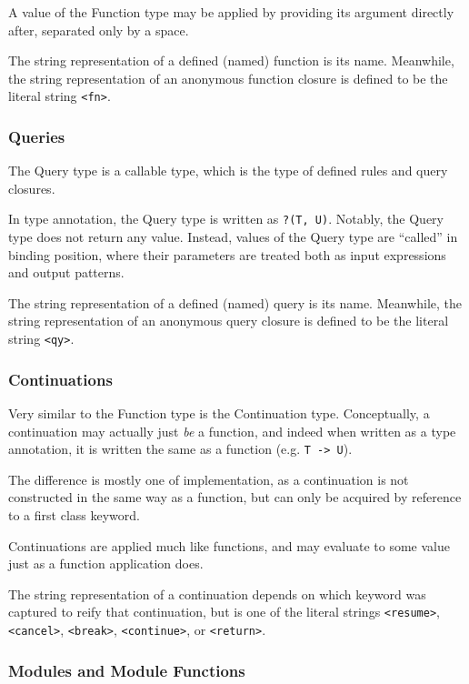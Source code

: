 A value of the Function type may be applied by providing its argument directly after,
separated only by a space.

The string representation of a defined (named) function is its name. Meanwhile, the
string representation of an anonymous function closure is defined to be the literal
string \texttt{<fn>}.

\subsubsection{Queries}

The Query type is a callable type, which is the type of defined rules and query
closures.

In type annotation, the Query type is written as \texttt{?(T, U)}. Notably, the
Query type does not return any value. Instead, values of the Query type are
``called'' in binding position, where their parameters are treated both as
input expressions and output patterns.

The string representation of a defined (named) query is its name. Meanwhile, the
string representation of an anonymous query closure is defined to be the literal
string \texttt{<qy>}.

\subsubsection{Continuations}

Very similar to the Function type is the Continuation type. Conceptually, a continuation
may actually just \emph{be} a function, and indeed when written as a type annotation, it
is written the same as a function (e.g. \texttt{T -> U}).

The difference is mostly one of implementation, as a continuation is not constructed in
the same way as a function, but can only be acquired by reference to a first class keyword.

Continuations are applied much like functions, and may evaluate to some value just as a
function application does.

The string representation of a continuation depends on which keyword was captured to
reify that continuation, but is one of the literal strings \texttt{<resume>}, \texttt{<cancel>},
\texttt{<break>}, \texttt{<continue>}, or \texttt{<return>}.

\subsubsection{Modules and Module Functions}

